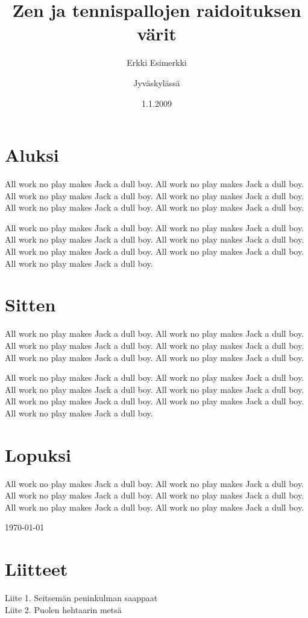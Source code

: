 \documentclass{vakioasiakirja}
\author{Erkki Esimerkki}
\date{1.1.2009}
\title{Zen ja tennispallojen raidoituksen värit}
\begin{document}
\maketitle

\section{Aluksi}

\align All work no play makes Jack a dull boy. All work no play makes Jack a dull boy. All work no play makes Jack a dull boy. All work no play makes Jack a dull boy. All work no play makes Jack a dull boy. All work no play makes Jack a dull boy.

All work no play makes Jack a dull boy. All work no play makes Jack a dull boy. All work no play makes Jack a dull boy. All work no play makes Jack a dull boy. All work no play makes Jack a dull boy. All work no play makes Jack a dull boy. All work no play makes Jack a dull boy.

\section{Sitten}

\align All work no play makes Jack a dull boy. All work no play makes Jack a dull boy. All work no play makes Jack a dull boy. All work no play makes Jack a dull boy. All work no play makes Jack a dull boy. All work no play makes Jack a dull boy.

All work no play makes Jack a dull boy. All work no play makes Jack a dull boy. All work no play makes Jack a dull boy. All work no play makes Jack a dull boy. All work no play makes Jack a dull boy. All work no play makes Jack a dull boy. All work no play makes Jack a dull boy.

\section{Lopuksi}

\align All work no play makes Jack a dull boy. All work no play makes Jack a dull boy. All work no play makes Jack a dull boy. All work no play makes Jack a dull boy. All work no play makes Jack a dull boy. All work no play makes Jack a dull boy.

\signature{Jyväskylässä}{\today}

\vfill

\section{Liitteet}

\align
Liite 1. Seitsemän peninkulman saappaat \\
Liite 2. Puolen hehtaarin metsä

\nopagenum
\end{document}
